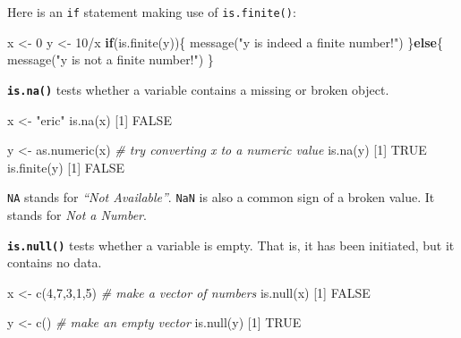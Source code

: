 \documentclass[
]{book}
\newenvironment{Shaded}{\begin{snugshade}}{\end{snugshade}}
\newcommand{\CommentTok}[1]{\textcolor[rgb]{0.56,0.35,0.01}{\textit{#1}}}
\newcommand{\ConstantTok}[1]{\textcolor[rgb]{0.00,0.00,0.00}{#1}}
\newcommand{\ControlFlowTok}[1]{\textcolor[rgb]{0.13,0.29,0.53}{\textbf{#1}}}
\newcommand{\DecValTok}[1]{\textcolor[rgb]{0.00,0.00,0.81}{#1}}
\newcommand{\FunctionTok}[1]{\textcolor[rgb]{0.00,0.00,0.00}{#1}}
\newcommand{\NormalTok}[1]{#1}
\newcommand{\OtherTok}[1]{\textcolor[rgb]{0.56,0.35,0.01}{#1}}
\newcommand{\SpecialCharTok}[1]{\textcolor[rgb]{0.00,0.00,0.00}{#1}}
\newcommand{\StringTok}[1]{\textcolor[rgb]{0.31,0.60,0.02}{#1}}
\begin{document}
Here is an \texttt{if} statement making use of \texttt{is.finite()}:

\begin{Shaded}
\begin{Highlighting}[]
\NormalTok{x }\OtherTok{\textless{}{-}} \DecValTok{0}
\NormalTok{y }\OtherTok{\textless{}{-}} \DecValTok{10}\SpecialCharTok{/}\NormalTok{x}
\ControlFlowTok{if}\NormalTok{(}\FunctionTok{is.finite}\NormalTok{(y))\{}
  \FunctionTok{message}\NormalTok{(}\StringTok{"y is indeed a finite number!"}\NormalTok{)}
\NormalTok{\}}\ControlFlowTok{else}\NormalTok{\{}
  \FunctionTok{message}\NormalTok{(}\StringTok{"y is not a finite number!"}\NormalTok{)}
\NormalTok{\}}
\end{Highlighting}
\end{Shaded}

\textbf{\texttt{is.na()}} tests whether a variable contains a missing or broken object.

\begin{Shaded}
\begin{Highlighting}[]
\NormalTok{x }\OtherTok{\textless{}{-}} \StringTok{"eric"}
\FunctionTok{is.na}\NormalTok{(x)}
\NormalTok{[}\DecValTok{1}\NormalTok{] }\ConstantTok{FALSE}

\NormalTok{y }\OtherTok{\textless{}{-}} \FunctionTok{as.numeric}\NormalTok{(x) }\CommentTok{\# try converting \textasciigrave{}x\textasciigrave{} to a numeric value}
\FunctionTok{is.na}\NormalTok{(y)}
\NormalTok{[}\DecValTok{1}\NormalTok{] }\ConstantTok{TRUE}
\FunctionTok{is.finite}\NormalTok{(y)}
\NormalTok{[}\DecValTok{1}\NormalTok{] }\ConstantTok{FALSE}
\end{Highlighting}
\end{Shaded}

\texttt{NA} stands for \emph{``Not Available''}. \texttt{NaN} is also a common sign of a broken value. It stands for \emph{Not a Number}.

\textbf{\texttt{is.null()}} tests whether a variable is empty. That is, it has been initiated, but it contains no data.

\begin{Shaded}
\begin{Highlighting}[]
\NormalTok{x }\OtherTok{\textless{}{-}} \FunctionTok{c}\NormalTok{(}\DecValTok{4}\NormalTok{,}\DecValTok{7}\NormalTok{,}\DecValTok{3}\NormalTok{,}\DecValTok{1}\NormalTok{,}\DecValTok{5}\NormalTok{) }\CommentTok{\# make a vector of numbers}
\FunctionTok{is.null}\NormalTok{(x)}
\NormalTok{[}\DecValTok{1}\NormalTok{] }\ConstantTok{FALSE}

\NormalTok{y }\OtherTok{\textless{}{-}} \FunctionTok{c}\NormalTok{() }\CommentTok{\# make an empty vector}
\FunctionTok{is.null}\NormalTok{(y)}
\NormalTok{[}\DecValTok{1}\NormalTok{] }\ConstantTok{TRUE}
\end{Highlighting}
\end{Shaded}
\end{document}
